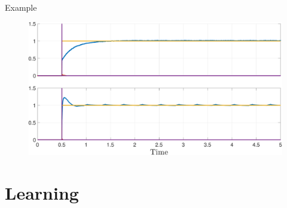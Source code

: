 \documentclass[17pt, t, lualatex]{beamer}
\begin{document}
\begin{frame}{Example}

	\begin{figure}
		\centering
		\includegraphics[scale = 0.45]{figures/plots/Control/compare_step_both_methods.pdf}
	\end{figure}

\end{frame}


\section{Learning}\insertsectionpage
\end{document}
